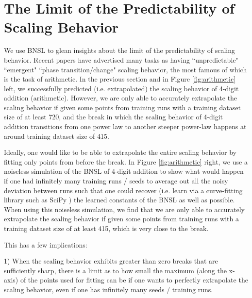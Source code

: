 \documentclass{article} %
\begin{document}
\section{The Limit of the Predictability of Scaling Behavior}
\vspace{-1.8mm}
\label{section:limit_of_agi_superforecasting}
We use BNSL to glean insights about the limit of the predictability of scaling behavior. Recent papers \citep{ganguli2022predictability, wei2022emergent} have advertised many tasks as having ``unpredictable" ``emergent" ``phase transition/change" scaling behavior, the most famous of which is the task of arithmetic. In the previous section and in Figure \ref{fig:arithmetic} left, we successfully predicted (i.e. extrapolated) the scaling behavior of 4-digit addition (arithmetic). However, we are only able to accurately extrapolate the scaling behavior if given some points from training runs with a training dataset size of at least 720, and the break in which the scaling behavior of 4-digit addition transitions from one power law to another steeper power-law happens at around training dataset size of 415. 

Ideally, one would like to be able to extrapolate the entire scaling behavior by fitting only points from before the break. In Figure \ref{fig:arithmetic} right, we use a noiseless simulation of the BNSL of 4-digit addition to show what would happen if one had infinitely many training runs / seeds to average out all the noisy deviation between runs such that one could recover (i.e. learn via a curve-fitting library such as SciPy \citep{virtanen2020scipy}) the learned constants of the BNSL as well as possible. When using this noiseless simulation, we find that we are only able to accurately extrapolate the scaling behavior if given some points from training runs with a training dataset size of at least 415, which is very close to the break. 



This has a few implications:

1) When the scaling behavior exhibits greater than zero breaks that are sufficiently sharp, there is a limit as to how small the maximum (along the x-axis) of the points used for fitting can be if one wants to perfectly extrapolate the scaling behavior, even if one has infinitely many seeds / training runs.
\end{document}

